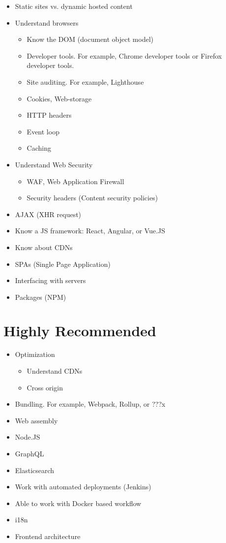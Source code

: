 \documentclass[12pt]{article}
\begin{document}
\begin{itemize}
\item Static sites vs. dynamic hosted content
\item Understand browsers
  \begin{itemize}
  \item Know the DOM (document object model)
  \item Developer tools.  For example, Chrome developer tools or Firefox developer tools.
  \item Site auditing.  For example, Lighthouse
  \item Cookies, Web-storage
  \item HTTP headers
  \item Event loop
  \item Caching
  \end{itemize}
\item Understand Web Security
  \begin{itemize}
  \item WAF, Web Application Firewall
  \item Security headers (Content security policies)
  \end{itemize}
\item AJAX (XHR request)
\item Know a JS framework: React, Angular, or Vue.JS
\item Know about CDNs
\item SPAs (Single Page Application)
\item Interfacing with servers
\item Packages (NPM)
\end{itemize}

\section{Highly Recommended}

\begin{itemize}
\item Optimization
  \begin{itemize}
  \item Understand CDNs
  \item Cross origin
  \end{itemize}
\item Bundling.  For example, Webpack, Rollup, or ???x
\item Web assembly
\item Node.JS
\item GraphQL
\item Elasticsearch
\item Work with automated deployments (Jenkins)
\item Able to work with Docker based workflow
\item i18n
\item Frontend architecture
\end{itemize}
\end{document}
